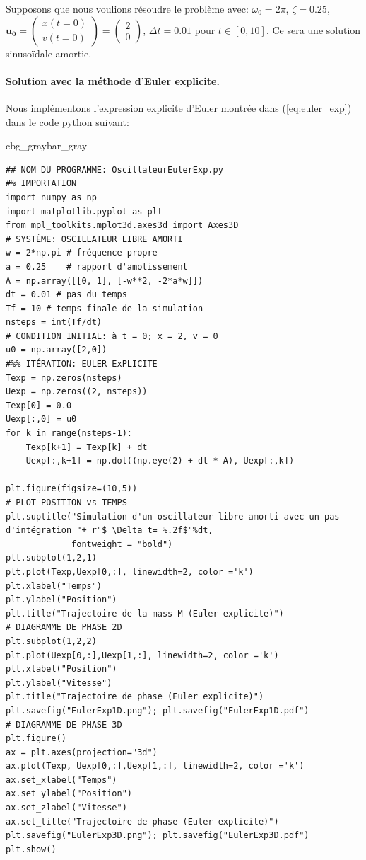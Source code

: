 \documentclass[%
oneside,                 %
final,                   %
10pt]{article}
\newenvironment{_pro_tight}[2]{
   \def\FrameCommand{\color{#2}\vrule width 1mm\normalcolor\colorbox{#1}}
   \FrameRule0.6pt\MakeFramed {\advance\hsize-2mm\FrameRestore}\vskip3mm}
   {\vskip0mm\endMakeFramed}
\newenvironment{pro}[2]{
\bgroup\rmfamily
\fboxsep=0mm\relax
\begin{_pro_tight}{#1}{#2}
\list{}{\parsep=-2mm\parskip=0mm\topsep=0pt\leftmargin=2mm
\rightmargin=2\leftmargin\leftmargin=4pt\relax}
\item\relax}
{\endlist\end{_pro_tight}\egroup}
\begin{document}
Supposons que nous voulions résoudre le problème avec: $\omega_0 = 2 \pi$, $\zeta = 0.25$, $\pmb{u_0}= \left(\begin{array}{c} x(t=0)\\ v(t=0) \end{array}\right)= \left(\begin{array}{c} 2\\ 0 \end{array}\right)$, $\Delta t = 0.01$ pour $t \in [0, 10]$. Ce sera une solution sinusoïdale amortie.

\paragraph{Solution avec la méthode d'Euler explicite.}
Nous implémentons l'expression explicite d'Euler montrée dans (\ref{eq:euler_exp}) dans le code python suivant:
\begin{pro}{cbg_gray}{bar_gray}\begin{verbatim}
## NOM DU PROGRAMME: OscillateurEulerExp.py
#% IMPORTATION
import numpy as np
import matplotlib.pyplot as plt
from mpl_toolkits.mplot3d.axes3d import Axes3D
# SYSTÈME: OSCILLATEUR LIBRE AMORTI
w = 2*np.pi # fréquence propre
a = 0.25    # rapport d'amotissement
A = np.array([[0, 1], [-w**2, -2*a*w]])
dt = 0.01 # pas du temps
Tf = 10 # temps finale de la simulation
nsteps = int(Tf/dt)
# CONDITION INITIAL: à t = 0; x = 2, v = 0
u0 = np.array([2,0])
#%% ITÉRATION: EULER ExPLICITE
Texp = np.zeros(nsteps)
Uexp = np.zeros((2, nsteps))
Texp[0] = 0.0
Uexp[:,0] = u0
for k in range(nsteps-1):
    Texp[k+1] = Texp[k] + dt
    Uexp[:,k+1] = np.dot((np.eye(2) + dt * A), Uexp[:,k])

plt.figure(figsize=(10,5))
# PLOT POSITION vs TEMPS
plt.suptitle("Simulation d'un oscillateur libre amorti avec un pas d'intégration "+ r"$ \Delta t= %.2f$"%dt,
             fontweight = "bold")
plt.subplot(1,2,1)
plt.plot(Texp,Uexp[0,:], linewidth=2, color ='k')
plt.xlabel("Temps")
plt.ylabel("Position")
plt.title("Trajectoire de la mass M (Euler explicite)")
# DIAGRAMME DE PHASE 2D
plt.subplot(1,2,2)
plt.plot(Uexp[0,:],Uexp[1,:], linewidth=2, color ='k')
plt.xlabel("Position")
plt.ylabel("Vitesse")
plt.title("Trajectoire de phase (Euler explicite)")
plt.savefig("EulerExp1D.png"); plt.savefig("EulerExp1D.pdf")
# DIAGRAMME DE PHASE 3D
plt.figure()
ax = plt.axes(projection="3d")
ax.plot(Texp, Uexp[0,:],Uexp[1,:], linewidth=2, color ='k')
ax.set_xlabel("Temps")
ax.set_ylabel("Position")
ax.set_zlabel("Vitesse")
ax.set_title("Trajectoire de phase (Euler explicite)")
plt.savefig("EulerExp3D.png"); plt.savefig("EulerExp3D.pdf")
plt.show()
\end{verbatim}
\end{pro}
\noindent
\end{document}
